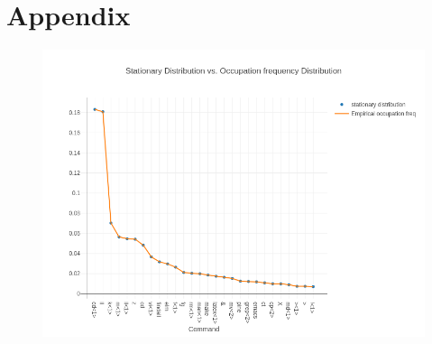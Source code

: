 \documentclass[10pt]{article}
\begin{document}
\section{Appendix}

\begin{figure}[!htb]
  \centering
  \includegraphics[scale=.50]{../pictures/stat-dist-and-empirical-occ-freq-dist.png}
  \caption{}
\end{figure}
\end{document}
